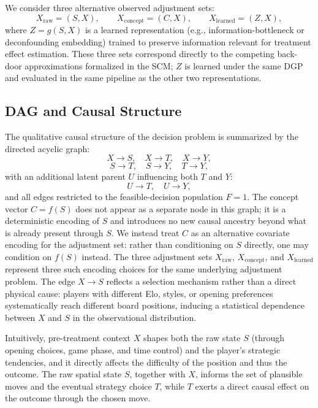 \documentclass{article}
\begin{document}
We consider three alternative observed adjustment sets:
\[
X_{\text{raw}} = (S, X), \qquad
X_{\text{concept}} = (C, X), \qquad
X_{\text{learned}} = (Z, X),
\]
where \(Z = g(S, X)\) is a learned representation (e.g., information-bottleneck or
deconfounding embedding) trained to preserve information relevant for treatment
effect estimation.\cite{kuang2020information,deconfoundingScores} These three sets
correspond directly to the competing back-door approximations formalized in the SCM;
$Z$ is learned under the same DGP and evaluated in the same pipeline as the other
two representations.

\subsection{DAG and Causal Structure}

The qualitative causal structure of the decision problem is summarized by the
directed acyclic graph:
\[
X \rightarrow S, \quad X \rightarrow T, \quad X \rightarrow Y,
\]
\[
S \rightarrow T, \quad S \rightarrow Y, \quad T \rightarrow Y,
\]
with an additional latent parent \(U\) influencing both \(T\) and \(Y\):
\[
U \rightarrow T, \quad U \rightarrow Y,
\]
and all edges restricted to the feasible-decision population \(F=1\). The concept
vector \(C = f(S)\) does not appear as a separate node in this graph; it is a
deterministic encoding of \(S\) and introduces no new causal ancestry beyond what
is already present through \(S\). We instead treat \(C\) as an alternative covariate
encoding for the adjustment set: rather than conditioning on \(S\) directly, one may
condition on \(f(S)\) instead. The three adjustment sets $X_{\text{raw}}$,
$X_{\text{concept}}$, and $X_{\text{learned}}$ represent three such encoding choices
for the same underlying adjustment problem. The edge \(X \rightarrow S\) reflects a
selection mechanism rather than a direct physical cause: players with different Elo,
styles, or opening preferences systematically reach different board positions,
inducing a statistical dependence between \(X\) and \(S\) in the observational
distribution.

Intuitively, pre-treatment context \(X\) shapes both the raw state \(S\) (through
opening choices, game phase, and time control) and the player's strategic tendencies,
and it directly affects the difficulty of the position and thus the outcome. The raw
spatial state \(S\), together with \(X\), informs the set of plausible moves and the
eventual strategy choice \(T\), while \(T\) exerts a direct causal effect on the
outcome through the chosen move.
\end{document}
